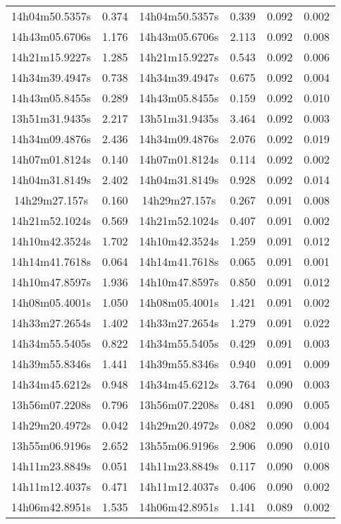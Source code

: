 \begin{table}
\begin{tabular}{cccccc}
14h04m50.5357s & 0.374 & 14h04m50.5357s & 0.339 & 0.092 & 0.002 \\
14h43m05.6706s & 1.176 & 14h43m05.6706s & 2.113 & 0.092 & 0.008 \\
14h21m15.9227s & 1.285 & 14h21m15.9227s & 0.543 & 0.092 & 0.006 \\
14h34m39.4947s & 0.738 & 14h34m39.4947s & 0.675 & 0.092 & 0.004 \\
14h43m05.8455s & 0.289 & 14h43m05.8455s & 0.159 & 0.092 & 0.010 \\
13h51m31.9435s & 2.217 & 13h51m31.9435s & 3.464 & 0.092 & 0.003 \\
14h34m09.4876s & 2.436 & 14h34m09.4876s & 2.076 & 0.092 & 0.019 \\
14h07m01.8124s & 0.140 & 14h07m01.8124s & 0.114 & 0.092 & 0.002 \\
14h04m31.8149s & 2.402 & 14h04m31.8149s & 0.928 & 0.092 & 0.014 \\
14h29m27.157s & 0.160 & 14h29m27.157s & 0.267 & 0.091 & 0.008 \\
14h21m52.1024s & 0.569 & 14h21m52.1024s & 0.407 & 0.091 & 0.002 \\
14h10m42.3524s & 1.702 & 14h10m42.3524s & 1.259 & 0.091 & 0.012 \\
14h14m41.7618s & 0.064 & 14h14m41.7618s & 0.065 & 0.091 & 0.001 \\
14h10m47.8597s & 1.936 & 14h10m47.8597s & 0.850 & 0.091 & 0.012 \\
14h08m05.4001s & 1.050 & 14h08m05.4001s & 1.421 & 0.091 & 0.002 \\
14h33m27.2654s & 1.402 & 14h33m27.2654s & 1.279 & 0.091 & 0.022 \\
14h34m55.5405s & 0.822 & 14h34m55.5405s & 0.429 & 0.091 & 0.003 \\
14h39m55.8346s & 1.441 & 14h39m55.8346s & 0.940 & 0.091 & 0.009 \\
14h34m45.6212s & 0.948 & 14h34m45.6212s & 3.764 & 0.090 & 0.003 \\
13h56m07.2208s & 0.796 & 13h56m07.2208s & 0.481 & 0.090 & 0.005 \\
14h29m20.4972s & 0.042 & 14h29m20.4972s & 0.082 & 0.090 & 0.004 \\
13h55m06.9196s & 2.652 & 13h55m06.9196s & 2.906 & 0.090 & 0.010 \\
14h11m23.8849s & 0.051 & 14h11m23.8849s & 0.117 & 0.090 & 0.008 \\
14h11m12.4037s & 0.471 & 14h11m12.4037s & 0.406 & 0.090 & 0.002 \\
14h06m42.8951s & 1.535 & 14h06m42.8951s & 1.141 & 0.089 & 0.002 \\

\end{tabular}
\end{table}
